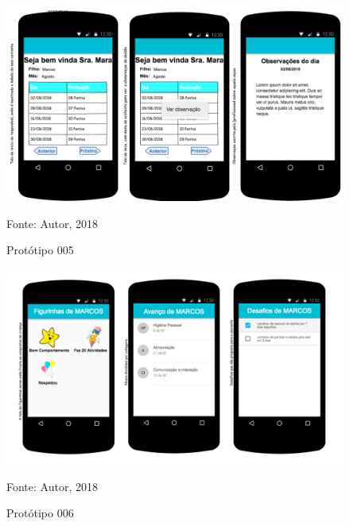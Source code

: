 \documentclass[
	12pt,				%
	openright,			%
	oneside,			%
	a4paper,			%
	english,			%
	brazil				%
	]{abntex2}
\theoremstyle{theorem}
\theoremstyle{definition}
\begin{document}
	\begin{figure}[H]
		\centering
		\includegraphics[width=1\linewidth]{img/inicioresponsvelinciorespcommenucontextoobservaodoprof}
		\caption{Protótipo 005}
		Fonte: Autor, 2018
		\label{p005}
\end{figure}

	\begin{figure}[H]
	\centering
	\includegraphics[width=1\linewidth]{img/emblemasniveisdesafios}
	\caption{Protótipo 006}
	Fonte: Autor, 2018
	\label{p006}
\end{figure}





%
%

\printindex
\end{document}
